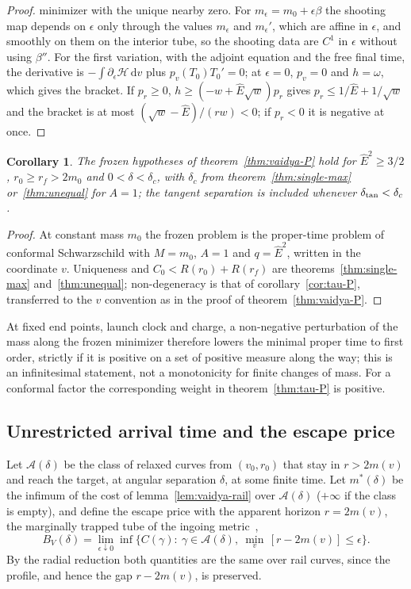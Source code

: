 \documentclass[aip,jmp,amsmath,amssymb,reprint]{revtex4-2}
\newcommand{\Ehat}{\hat E}
\newcommand{\dd}{\mathrm{d}}
\theoremstyle{plain}
\newtheorem{corollary}[proposition]{Corollary}
\theoremstyle{definition}
\begin{document}
\begin{proof}
minimizer with the unique nearby zero. For $m_\epsilon=m_0+\epsilon\beta$ the shooting map depends on $\epsilon$ only through the values $m_\epsilon$ and $m_\epsilon'$, which are affine in
$\epsilon$, and smoothly on them on the interior tube, so the shooting data are $C^1$ in $\epsilon$ without using
$\beta''$. For the first variation, with the adjoint equation and the free final time, the derivative is
$-\int\partial_\epsilon\mathcal H\,\dd v$ plus $p_v(T_0)T_0'=0$; at $\epsilon=0$, $p_v=0$ and $h=\omega$, which gives the
bracket. If $p_r\ge0$, $h\ge(-w+\Ehat\sqrt w)p_r$ gives $p_r\le1/\Ehat+1/\sqrt w$ and the bracket is at
most $(\sqrt w-\Ehat)/(rw)<0$; if $p_r<0$ it is negative at once.
\end{proof}

\begin{corollary}\label{cor:vaidya-P}
The frozen hypotheses of theorem~\ref{thm:vaidya-P} hold for $\Ehat^2\ge3/2$, $r_0\ge r_f>2m_0$ and
$0<\delta<\delta_c$, with $\delta_c$ from theorem~\ref{thm:single-max} or~\ref{thm:unequal} for $A=1$;
the tangent separation is included whenever $\delta_{\rm tan}<\delta_c$.
\end{corollary}

\begin{proof}
At constant mass $m_0$ the frozen problem is the proper-time problem of conformal Schwarzschild with $M=m_0$,
$A=1$ and $q=\Ehat^2$, written in the coordinate $v$. Uniqueness and $C_0<R(r_0)+R(r_f)$ are
theorems~\ref{thm:single-max} and~\ref{thm:unequal}; non-degeneracy is that of corollary~\ref{cor:tau-P},
transferred to the $v$ convention as in the proof of theorem~\ref{thm:vaidya-P}.
\end{proof}

At fixed end points, launch clock and charge, a non-negative perturbation of the mass along
the frozen minimizer therefore lowers the minimal proper time to first order, strictly if it
is positive on a set of positive measure along the way; this is an infinitesimal statement,
not a monotonicity for finite changes of mass. For a conformal factor the corresponding
weight in theorem~\ref{thm:tau-P} is positive.

\subsection{Unrestricted arrival time and the escape price}
\label{sec:vaidya-escape}
Let $\mathcal A(\delta)$ be the class of relaxed curves from $(v_0,r_0)$ that stay in $r>2m(v)$
and reach the target, at angular separation $\delta$, at some finite time. Let $m^*(\delta)$ be the
infimum of the cost of lemma~\ref{lem:vaidya-rail} over $\mathcal A(\delta)$ ($+\infty$ if the class
is empty), and define the escape price with the apparent horizon $r=2m(v)$, the marginally trapped
tube of the ingoing metric~\cite{Hayward1996,AshtekarKrishnan2003,Booth2005},
\[
  B_V(\delta)=\lim_{\epsilon\downarrow0}\inf\Big\{C(\gamma):\ \gamma\in\mathcal A(\delta),\
  \min_v\,[r-2m(v)]\le\epsilon\Big\}.
\]
By the radial reduction both quantities are the same over rail curves, since the profile,
and hence the gap $r-2m(v)$, is preserved.
\end{document}
